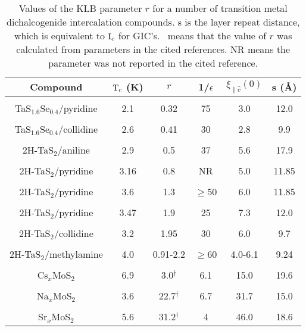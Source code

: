 \begin{table}
\caption[Values of the KLB parameter $r$ for a number of
transition metal dichalcogenide intercalation compounds.]{Values of the KLB
parameter $r$ for a number of transition metal dichalcogenide intercalation
compounds.  s  is the layer repeat  distance, which  is equivalent  to $\rm
I_c$  for GIC's.  \dag\  means that the   value  of  $r$ was calculated from
parameters in the cited references. NR means the parameter was not reported
in the cited reference.}
\label{tmdcicklb}
\begin{center}
\begin{tabular}{|c|ccccc|}
\hline
Compound & $\rm T_c$ (K) & $r$ & 1/$\epsilon$ & $\xi_{\parallel \hat{c}}(0)$ & s (\AA) \\
\hline
& & & & & \\
TaS$_{1.6}$Se$_{0.4}$/pyridine\cite{prober80} & 2.1 & 0.32& 75& 3.0 & 12.0  \\
& & & & & \\
TaS$_{1.6}$Se$_{0.4}$/collidine\cite{prober80}& 2.6 & 0.41& 30& 2.8 & 9.9 \\
& & & & & \\
2H-TaS$_2$/aniline\cite{prober80} & 2.9 & 0.5& 37  & 5.6& 17.9 \\
& & & & & \\
2H-TaS$_2$/pyridine\cite{muto78}& 3.16  & 0.8& NR & 5.0 & 11.85 \\
& & & & & \\
2H-TaS$_2$/pyridine\cite{coleman83} & 3.6 & 1.3& $\geq$50 & 6.0 & 11.85 \\
& & & & & \\
2H-TaS$_2$/pyridine\cite{prober80} & 3.47 &  1.9& 25 & 7.3 & 12.0 \\
& & & & & \\
2H-TaS$_2$/collidine\cite{prober80}& 3.2 & 1.95& 30& 6.0 & 9.7 \\
& & & & & \\
2H-TaS$_2$/methylamine\cite{coleman83}& 4.0 &0.91-2.2 & $\geq$60 & 4.0-6.1 & 9.24 \\
& & & & & \\
Cs$ _x$MoS$_2$\cite{woollam76,somoano73}& 6.9 & 3.0$^{\dagger}$ & 6.1 & 15.0 & 19.6 \\
& & & & & \\
Na$ _x$MoS$_2$\cite{woollam76,somoano75} & 3.6 & 22.7$^{\dagger}$ & 6.7 & 31.7 & 15.0 \\
& & & & & \\
Sr$ _x$MoS$_2$\cite{woollam76,somoano75}& 5.6 & 31.2$^{\dagger}$ & 4 & 46.0 & 18.6 \\

\end{tabular}
\end{center}
\end{table}
